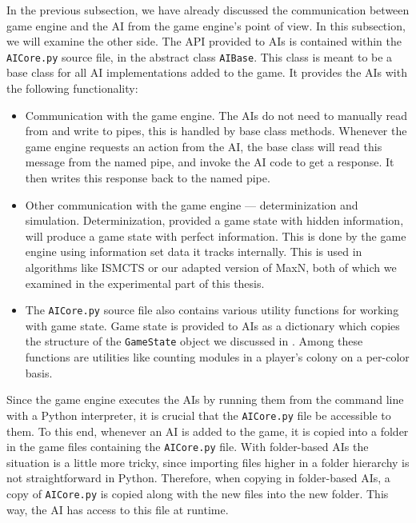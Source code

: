 In the previous subsection, we have already discussed the communication between
game engine and the AI from the game engine's point of view. In this subsection,
we will examine the other side. The API provided to AIs is contained
within the \texttt{AICore.py} source file, in the abstract class \texttt{AIBase}.
This class is meant to be a base class for all AI implementations
added to the game. It provides the AIs with the following functionality:
\begin{itemize}
    \item Communication with the game engine. The AIs do not need to
        manually read from and write to pipes, this is handled by base
        class methods. Whenever the game engine requests an action from the
        AI, the base class will read this message from the named pipe, and invoke
        the AI code to get a response. It then writes this response back to the
        named pipe.
    \item Other communication with the game engine --- determinization
        and simulation. Determinization, provided a game state with hidden
        information, will produce a game state with perfect information. This
        is done by the game engine using information set data it tracks
        internally. This is used in algorithms like ISMCTS or our adapted
        version of MaxN, both of which we examined in the experimental
        part of this thesis.
    \item The \texttt{AICore.py} source file also contains various
        utility functions for working with game state.
        Game state is provided to AIs as a dictionary which
        copies the structure of the \texttt{GameState}
        object we discussed in .
        Among these functions are utilities like counting
        modules in a player's colony on a per-color basis.
\end{itemize}

Since the game engine executes the AIs by running them from the command line
with a Python interpreter, it is crucial that the \texttt{AICore.py}
file be accessible to them. To this end, whenever an AI is added to the game,
it is copied into a folder in the game files containing the \texttt{AICore.py}
file. With folder-based AIs the situation is a little more tricky, since
importing files higher in a folder hierarchy is not straightforward in Python.
Therefore, when copying in folder-based AIs, a copy of \texttt{AICore.py}
is copied along with the new files into the new folder. This way, the AI
has access to this file at runtime.

